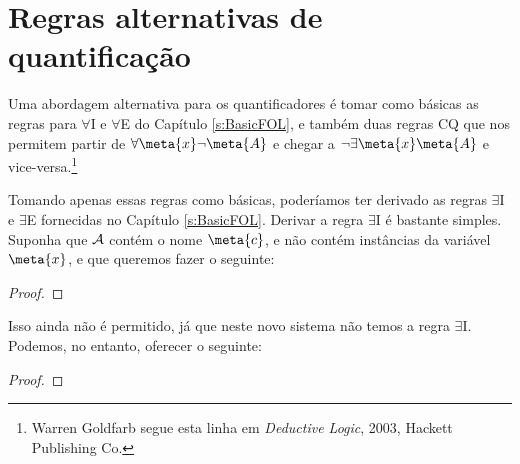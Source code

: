 \section{Regras alternativas de quantificação}
Uma abordagem alternativa para os quantificadores é tomar como básicas as regras para $\forall$I e $\forall$E do Capítulo \ref{s:BasicFOL}, e também duas regras CQ que nos permitem partir de $\forall \meta{x} \enot \meta{A}$ e chegar a $\enot \exists \meta{x} \meta{A}$ e vice-versa.\footnote{Warren Goldfarb segue esta linha em \emph{Deductive Logic}, 2003, Hackett Publishing Co.}

Tomando apenas essas regras como básicas, poderíamos ter derivado as regras $\exists$I e $\exists$E fornecidas no Capítulo \ref{s:BasicFOL}. Derivar a regra $\exists$I é bastante simples. Suponha que $\mathcal{A}$ contém o nome $\meta{c}$, e não contém instâncias da variável $\meta{x}$, e que queremos fazer o seguinte: 

\begin{proof}
\end{proof}

Isso ainda não é permitido, já que neste novo sistema não temos a regra $\exists$I. Podemos, no entanto, oferecer o seguinte:

\begin{proof}
	\open
	\close
\end{proof}\noindent


